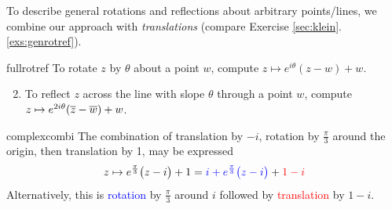 To describe general rotations and reflections about arbitrary points/lines, we combine our approach with \emph{translations} (compare Exercise \ref*{sec:klein}.\ref{exs:genrotref}).


\begin{cor}{}{fullrotref}
	\exstart To rotate $z$ by $\theta$ about a point $w$, compute $z\mapsto e^{i\theta}(z-w)+w$.
	\begin{enumerate}\setcounter{enumi}{1}
	  \item To reflect $z$ across the line with slope $\theta$ through a point $w$, compute $z\mapsto e^{2i\theta}(\overline{z}-\overline{w})+w$.
	\end{enumerate}
\end{cor}

\begin{example}{}{complexcombi}
	The combination of translation by $-i$, rotation by $\frac\pi 3$ around the origin, then translation by 1, may be expressed
	\[
		z\mapsto e^{\frac\pi 3}\bigl(z-i\bigr)+1=\textcolor{blue}{i+e^{\frac\pi 3}\bigl(z-i\bigr)}+\textcolor{red}{1-i}
	\]
	Alternatively, this is \textcolor{blue}{rotation} by $\frac\pi 3$ around $i$ followed by \textcolor{red}{translation} by $1-i$.
\end{example}

\bigskip


